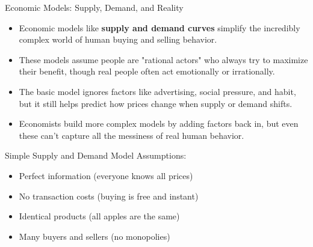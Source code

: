 \documentclass{beamer}
\begin{document}
	\begin{frame}{Economic Models: Supply, Demand, and Reality}
		\begin{itemize}
			\item Economic models like \textbf{supply and demand curves} simplify the incredibly complex world of human buying and selling behavior.
			\item These models assume people are "rational actors" who always try to maximize their benefit, though real people often act emotionally or irrationally.
			\item The basic model ignores factors like advertising, social pressure, and habit, but it still helps predict how prices change when supply or demand shifts.
			\item Economists build more complex models by adding factors back in, but even these can't capture all the messiness of real human behavior.
		\end{itemize}
		
		\begin{example}
			\scriptsize
			Simple Supply and Demand Model Assumptions:
			\begin{itemize}
				\item Perfect information (everyone knows all prices)
				\item No transaction costs (buying is free and instant)
				\item Identical products (all apples are the same)
				\item Many buyers and sellers (no monopolies)
			\end{itemize}
		\end{example}
	\end{frame}
	
\end{document}
